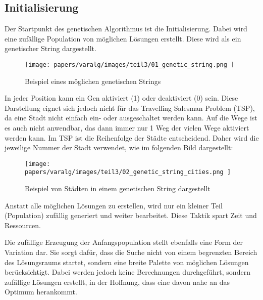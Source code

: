 %
%
%
%
\subsection{Initialisierung
\label{buch:paper:varalg:subsection:initialization}}
Der Startpunkt des genetischen Algorithmus ist die Initialisierung.
Dabei wird eine zufällige Population von möglichen Lösungen erstellt.
Diese wird als ein genetischer String dargestellt.

\begin{figure}
	\centering
	\texttt{[image: 
        papers/varalg/images/teil3/01\_genetic\_string.png
        ]}
	\caption{Beispiel eines möglichen genetischen Strings}
	\label{fig:possible_genetic_string}
\end{figure}

In jeder Position kann ein Gen aktiviert (1) oder deaktiviert (0) sein.
Diese Darstellung eignet sich jedoch nicht für das Travelling Salesman 
Problem (TSP), da eine Stadt nicht einfach ein- oder ausgeschaltet werden kann.
Auf die Wege ist es auch nicht anwendbar, das dann immer nur 1 Weg der vielen Wege 
aktiviert werden kann. Im TSP ist die Reihenfolge der Städte entscheidend. 
Daher wird die jeweilige Nummer der Stadt verwendet, wie im folgenden Bild 
\cite{cities_genetic_string} dargestellt:

\begin{figure}
	\centering
	\texttt{[image: 
        papers/varalg/images/teil3/02\_genetic\_string\_cities.png
        ]}
	\caption{Beispiel von Städten in einem genetischen String dargestellt}
	\label{fig:cities_genetic_string}
\end{figure}

Anstatt alle möglichen Lösungen zu erstellen, wird nur ein kleiner Teil 
(Population) zufällig generiert und weiter bearbeitet. Diese Taktik 
spart Zeit und Ressourcen.

Die zufällige Erzeugung der Anfangspopulation stellt ebenfalls eine Form 
der Variation dar. Sie sorgt dafür, dass die Suche nicht von einem begrenzten 
Bereich des Lösungsraums startet, sondern eine breite Palette von möglichen 
Lösungen berücksichtigt. Dabei werden jedoch keine Berechnungen durchgeführt, 
sondern zufällige Lösungen erstellt, in der Hoffnung, dass eine davon nahe 
an das Optimum herankommt.

